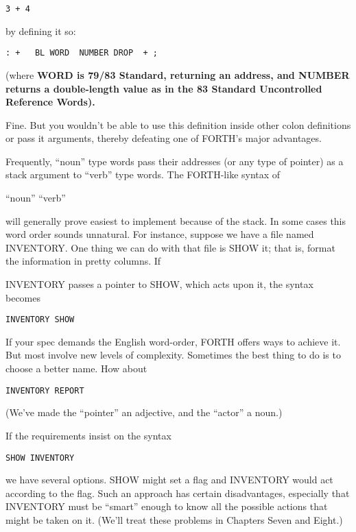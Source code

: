 \begin{verbatim}
3 + 4
\end{verbatim}

by defining it so:

\begin{verbatim}
: +   BL WORD  NUMBER DROP  + ;
\end{verbatim}

(where \bf{WORD} is 79/83 Standard, returning an address, and \bf{NUMBER}
returns a double-length value as in the 83 Standard Uncontrolled
Reference Words).

Fine. But you wouldn't be able to use this definition inside other
colon definitions or pass it arguments, thereby defeating one of FORTH's
major advantages.

Frequently, ``noun'' type words pass their addresses (or any type of
pointer) as a stack argument to ``verb'' type words. The FORTH-like syntax of

``noun'' ``verb''

will generally prove easiest to implement because of the stack.
In some cases this word order sounds unnatural. For instance, suppose
we have a file named INVENTORY. One thing we can do with that
file is SHOW it; that is, format the information in pretty columns. If


INVENTORY passes a pointer to SHOW, which acts upon it, the syntax
becomes

\begin{verbatim}
INVENTORY SHOW
\end{verbatim}

If your spec demands the English word-order, FORTH offers ways to
achieve it. But most involve new levels of complexity. Sometimes the
best thing to do is to choose a better name. How about

\begin{verbatim}
INVENTORY REPORT
\end{verbatim}

(We've made the ``pointer'' an adjective, and the ``actor'' a noun.)

If the requirements insist on the syntax

\begin{verbatim}
SHOW INVENTORY
\end{verbatim}

we have several options. SHOW might set a flag and INVENTORY
would act according to the flag. Such an approach has certain disadvantages,
especially that INVENTORY must be ``smart'' enough to
know all the possible actions that might be taken on it. (We'll treat these
problems in Chapters Seven and Eight.)

